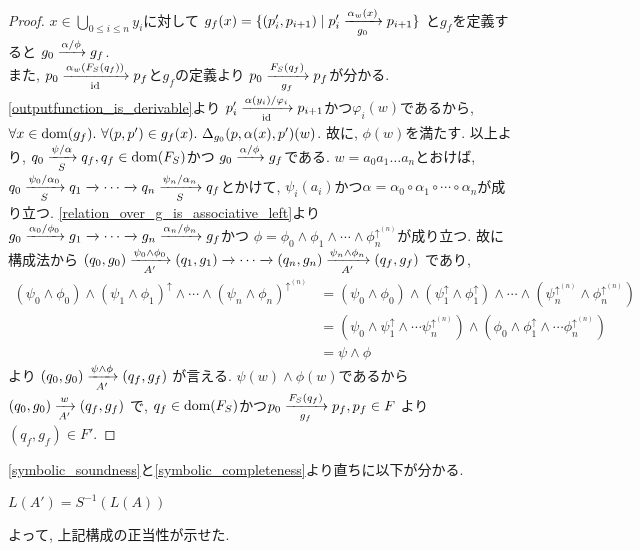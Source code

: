 \documentclass[uplatex,dvipdfmx,a4j]{jsreport}
\begin{document}
\begin{proof}
    $x \in \bigcup_{0 \leq i \le n} y_i$に対して
    $g_f(x) = \{ (p'_i, p_{i + 1}) \mid p'_i \transarrow{\alpha_w(x)}{g_0} p_{i + 1} \}$
    と$g_f$を定義すると
    $g_0 \transarrow{\alpha / \phi}{} g_f$.  \\
    また, $p_0 \transarrow{\alpha_w(F_S(q_f))}{\scriptsize \id} p_f$と$g_f$の定義より
    $p_0 \transarrow{F_S(q_f)}{g_f} p_f$が分かる.
    \ref{outputfunction_is_derivable}より
    $p'_i \transarrow{\alpha(y_i) / \varphi_i}{\scriptsize \id} p_{i + 1}$かつ$\varphi_i(w)$であるから,
    $\forall x \in \dom(g_f).\ \forall (p, p') \in g_f(x).\
    \Delta_{g_0}(p, \alpha(x), p')(w)$.
    故に, $\phi(w)$を満たす.
    以上より,
    $q_0 \transarrow{\psi / \alpha}{S} q_f, q_f \in \dom(F_S)$かつ
    $g_0 \transarrow{\alpha / \phi}{} g_f$である.
    $w = a_0a_1 \ldots a_n$とおけば,
    $q_0 \transarrow{\psi_0 / \alpha_0}{S} q_1 \transarrow{}{} \cdots
    \transarrow{}{} q_n \transarrow{\psi_n / \alpha_n}{S} q_f$とかけて,
    $\psi_i(a_i)$かつ$\alpha = \alpha_0 \circ \alpha_1 \circ \cdots \circ \alpha_n$が成り立つ.
    \ref{relation_over_g_is_associative_left}より
    $g_0 \transarrow{\alpha_0 / \phi_0}{} g_1 \transarrow{}{} \cdots
    \transarrow{}{} g_n \transarrow{\alpha_n / \phi_n}{} g_f$かつ
    $\phi = \phi_0 \land \phi_1 \land \cdots \land \phi_n^{\uparrow^{(n)}}$が成り立つ.
    故に構成法から
    $(q_0, g_0) \transarrow{\psi_0 \land \phi_0}{A'} (q_1, g_1) \transarrow{}{} \cdots
    \transarrow{}{} (q_n, g_n) \transarrow{\psi_n \land \phi_n}{A'} (q_f, g_f)$
    であり,
    \begin{align*}
      (\psi_0 \land \phi_0) \land (\psi_1 \land \phi_1)^\uparrow \land \cdots
      \land (\psi_n \land \phi_n)^{\uparrow^{(n)}} &=
      (\psi_0 \land \phi_0) \land (\psi_1^\uparrow \land \phi_1^\uparrow) \land \cdots
      \land (\psi_n^{\uparrow^{(n)}} \land \phi_n^{\uparrow^{(n)}}) \\
      &= (\psi_0 \land \psi_1^\uparrow \land \cdots \psi_n^{\uparrow^{(n)}}) \land
      (\phi_0 \land \phi_1^\uparrow \land \cdots \phi_n^{\uparrow^{(n)}}) \\
      &= \psi \land \phi
    \end{align*}
    より
    $(q_0, g_0) \transarrow{\psi \land \phi}{A'} (q_f, g_f)$
    が言える.
    $\psi(w) \land \phi(w)$であるから
    $(q_0, g_0) \transarrow{w}{A'} (q_f, g_f)$
    で, $q_f \in \dom(F_S)$かつ$p_0 \transarrow{F_S(q_f)}{g_f} p_f, p_f \in F$
    より$(q_f, g_f) \in F'$.
  \end{proof}

  \ref{symbolic_soundness}と\ref{symbolic_completeness}より直ちに以下が分かる.

  \begin{theorem}
    $L(A') = S^{-1}(L(A))$
  \end{theorem}

  よって, 上記構成の正当性が示せた.
\end{document}
